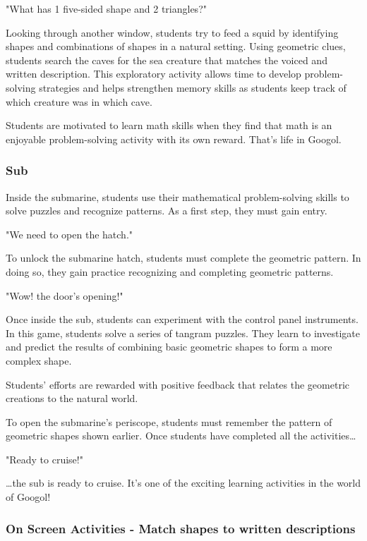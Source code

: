 "What has 1 five-sided shape and 2 triangles?"

Looking through another window, students try to feed a squid by identifying shapes and combinations of shapes in a natural setting.
Using geometric clues, students search the caves for the sea creature that matches the voiced and written description.
This exploratory activity allows time to develop problem-solving strategies and helps strengthen memory skills as students keep track of which creature was in which cave.

Students are motivated to learn math skills when they find that math is an enjoyable problem-solving activity with its own reward.
That's life in Googol.

\subsubsection{Sub}

Inside the submarine, students use their mathematical problem-solving skills to solve puzzles and recognize patterns.
As a first step, they must gain entry.

"We need to open the hatch."

To unlock the submarine hatch, students must complete the geometric pattern.
In doing so, they gain practice recognizing and completing geometric patterns.

"Wow! the door's opening!"

Once inside the sub, students can experiment with the control panel instruments.
In this game, students solve a series of tangram puzzles.
They learn to investigate and predict the results of combining basic geometric shapes to form a more complex shape.

Students' efforts are rewarded with positive feedback that relates the geometric creations to the natural world.

To open the submarine's periscope, students must remember the pattern of geometric shapes shown earlier.
Once students have completed all the activities\dots

"Ready to cruise!"

\dots the sub is ready to cruise.
It's one of the exciting learning activities in the world of Googol!

\subsubsection{On Screen Activities - Match shapes to written descriptions}

